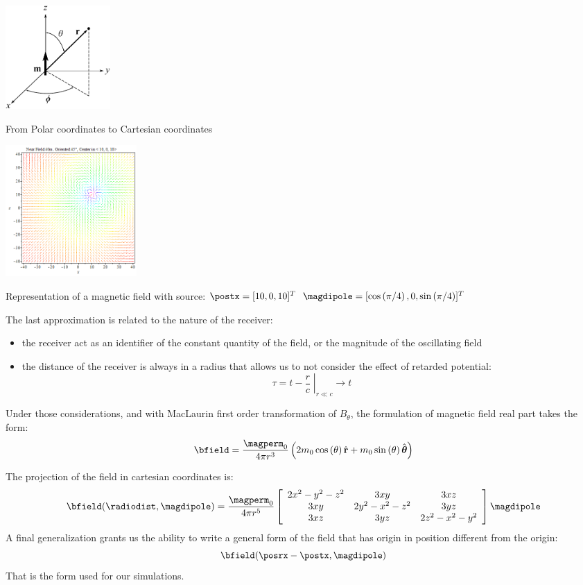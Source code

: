 \begin{marginfigure}
	\centering
	\includegraphics[width=4cm]{ch2/img/coord_pol_cart.pdf}
	\caption{From Polar coordinates to Cartesian coordinates}
	\label{fig:polar2cartesian}
\end{marginfigure}
\begin{marginfigure}
	\centering
	\includegraphics[width=5cm]{ch2/img/campo_casuale.png}
	\caption{Representation of a magnetic field with source: \newline $\postx = [10, 0, 10]^T$ \newline $\magdipole=[\ccos{\pi/4},0,\ssin{\pi/4}]^T$}
	\label{fig:dipolomagneticocasuale}
\end{marginfigure}
The last approximation is related to the nature of the receiver:
\begin{itemize}
\item the receiver act as an identifier of the constant quantity of the field, or the magnitude of the oscillating field
\item the distance of the receiver is always in a radius that allows us to not consider the effect of retarded potential: 
		\[\tau = \left. t - \dfrac{r}{c} \;\right|_{r\ll c}  \longrightarrow t \]
\end{itemize}

Under those considerations, and with MacLaurin first order transformation of $B_{\theta}$, the formulation of magnetic field real part takes the form:
\begin{equation}
\bfield = \dfrac{\magperm_0}{4 \pi r^3} \braces{ 2 m_0 \ccos{\theta} \vers{r} + m_0 \ssin{\theta} \vrtheta }
\label{eq:magneticfieldpolar}
\end{equation}

The projection of the field in cartesian coordinates is:
\begin{equation}
\bfield(\radiodist,\magdipole) = \dfrac{\magperm_0}{4 \pi r^5} \magfieldmatrix \magdipole
\end{equation}
A final generalization grants us the ability to write a general form of the field that has origin in position different from the origin:
\begin{equation}
\bfield(\posrx - \postx,\magdipole)
\end{equation}
That is the form used for our simulations.